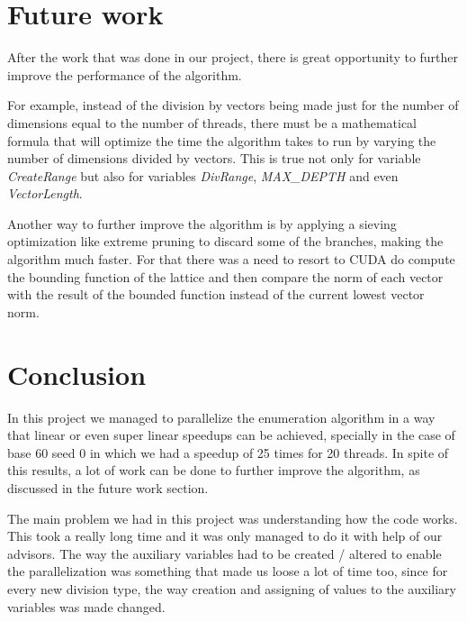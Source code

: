 \documentclass[conference]{IEEEtran}
\begin{document}
\section{Future work}
After the work that was done in our project, there is great opportunity to further improve the performance of the algorithm. 

For example, instead of the division by vectors being made just for the number of dimensions equal to the number of threads, there must be a mathematical formula that will optimize the time the algorithm takes to run by varying the number of dimensions divided by vectors. This is true not only for variable \emph{CreateRange} but also for variables \emph{DivRange}, \emph{MAX\_DEPTH} and even \emph{VectorLength}.

Another way to further improve the algorithm is by applying a sieving optimization like extreme pruning to discard some of the branches, making the algorithm much faster. For that there was a need to resort to CUDA do compute the bounding function of the lattice and then compare the norm of each vector with the result of the bounded function instead of the current lowest vector norm.


\section{Conclusion}
In this project we managed to parallelize the enumeration algorithm in a way that linear or even super linear speedups can be achieved, specially in the case of base 60 seed 0 in which we had a speedup of 25 times for 20 threads.
In spite of this results, a lot of work can be done to further improve the algorithm, as discussed in the future work section. 

The main problem we had in this project was understanding how the code works. This took a really long time and it was only managed to do it with help of our advisors. The way the auxiliary variables had to be created / altered to enable the parallelization was something that made us loose a lot of time too, since for every new division type, the way creation and assigning of values to the auxiliary variables was made changed.
\end{document}
